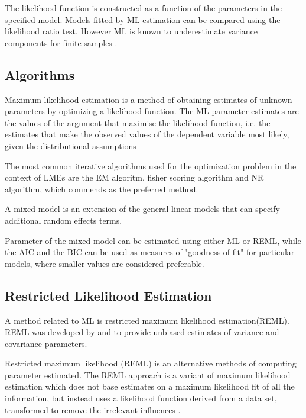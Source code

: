 \documentclass[12pt, a4paper]{report}
\theoremstyle{plain}
\theoremstyle{definition}
\theoremstyle{remark}
\begin{document}
	The	likelihood function is constructed as a function of the parameters
	in the specified model. Models fitted by ML estimation can be compared using the likelihood ratio test. However ML is known to underestimate variance components for finite samples \citep{Demi}. 
	

	
	
	
	
	
	\subsection{Algorithms}
	Maximum likelihood estimation is a method of obtaining estimates
	of unknown parameters by optimizing a likelihood function. The ML
	parameter estimates are the values of the argument that maximise
	the likelihood function, i.e. the estimates that make the observed
	values of the dependent variable most likely, given the
	distributional assumptions
	
	The most common iterative algorithms used for the optimization
	problem in the context of LMEs are the EM algoritm, fisher scoring
	algorithm and NR algorithm, which \citet{west} commends as the
	preferred method.
	
	A mixed model is an extension of the general linear models that
	can specify additional random effects terms.
	
	Parameter of the mixed model can be estimated using either ML or
	REML, while the AIC and the BIC can be used as measures of
	"goodness of fit" for particular models, where smaller values are
	considered preferable.
	
	
\subsection{Restricted Likelihood Estimation}
A method related to ML is restricted maximum likelihood
	estimation(REML). REML was developed by \citet*{PT71} and
	\citet{Harville} to provide unbiased estimates of variance and
	covariance parameters. 
	
Restricted maximum likelihood (REML) is an alternative methods of
		computing parameter estimated. The REML approach is a variant of maximum likelihood estimation which does not base estimates on a maximum likelihood fit of all the information, but instead uses a likelihood function derived from a data set, transformed to remove the irrelevant influences \citep{REMLDefine}.
		
\end{document}
